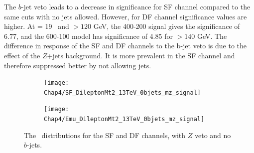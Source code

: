 The $b$-jet veto leads to a decrease in significance for SF channel compared to the same cuts with no jets allowed. However, for DF channel significance values are higher. At \lumi= 19 \invfb \, and \mttwo $>120$ GeV, the 400-200 signal gives the significance of 6.77, and the 600-100 model has significance of 4.85 for  \mttwo$>140$ GeV. The difference in response of the SF and DF channels to the b-jet veto is due to the effect of the $Z$+jets background. It is more prevalent in the SF channel and therefore suppressed better by not allowing jets. 

 

\begin{figure}[H]	   
	\begin{subfigure}[t]{0.5\textwidth}
		\label{fig:SF_0jets_mz_mt2}
        \texttt{[image: Chap4/SF\_DileptonMt2\_13TeV\_0bjets\_mz\_signal]} 
        \end{subfigure} 
     \begin{subfigure}[t]{0.5\textwidth}
     	\label{fig:SF_0jets_mz_metrel}
        \texttt{[image: Chap4/Emu\_DileptonMt2\_13TeV\_0bjets\_mz\_signal]} 
        \end{subfigure}
        \captionsetup{width=0.8\textwidth}
\caption{The \mttwo \, distributions for the SF and DF channels, with $Z$ veto and no $b$-jets.}	
        \label{fig:SF_0bjets_mz}
\end{figure}
